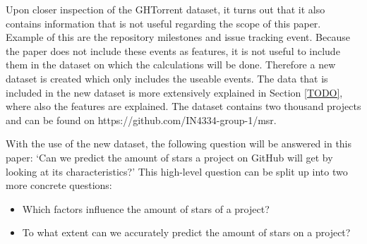 
    Upon closer inspection of the GHTorrent dataset, it turns out that it also contains information that is not useful regarding the scope of this paper. 
    Example of this are the repository milestones and issue tracking event.
    Because the paper does not include these events as features, it is not useful to include them in the dataset on which the calculations will be done. 
    Therefore a new dataset is created which only includes the useable events. 
    The data that is included in the new dataset is more extensively explained in Section \ref{TODO}, where also the features are explained.
    The dataset contains two thousand projects and can be found on  https://github.com/IN4334-group-1/msr.

    With the use of the new dataset, the following question will be answered in this paper: `Can we predict the amount of stars a project on GitHub will get by looking at its characteristics?'
    This high-level question can be split up into two more concrete questions:
    \begin{itemize}
        \item Which factors influence the amount of stars of a project?
        \item To what extent can we accurately predict the amount of stars on a project?
    \end{itemize}






